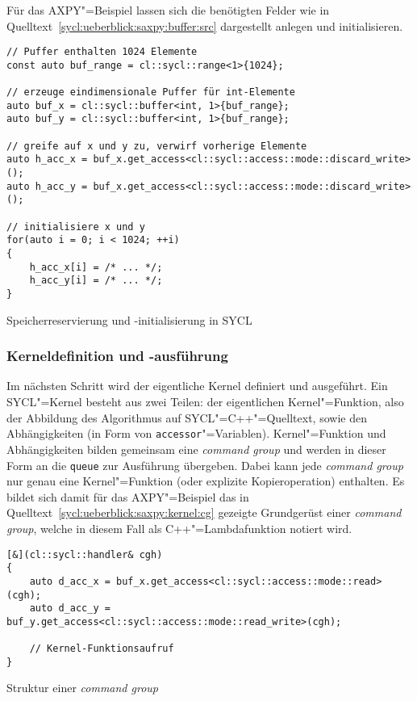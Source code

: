 Für das AXPY"=Beispiel lassen sich die benötigten Felder wie in
Quelltext~\ref{sycl:ueberblick:saxpy:buffer:src} dargestellt anlegen und
initialisieren.
%
\begin{code}
    \begin{verbatim}
// Puffer enthalten 1024 Elemente
const auto buf_range = cl::sycl::range<1>{1024};

// erzeuge eindimensionale Puffer für int-Elemente
auto buf_x = cl::sycl::buffer<int, 1>{buf_range};
auto buf_y = cl::sycl::buffer<int, 1>{buf_range};

// greife auf x und y zu, verwirf vorherige Elemente
auto h_acc_x = buf_x.get_access<cl::sycl::access::mode::discard_write>();
auto h_acc_y = buf_x.get_access<cl::sycl::access::mode::discard_write>();

// initialisiere x und y
for(auto i = 0; i < 1024; ++i)
{
    h_acc_x[i] = /* ... */;
    h_acc_y[i] = /* ... */;
}
    \end{verbatim}
    \caption{Speicherreservierung und -initialisierung in SYCL}
    \label{sycl:ueberblick:saxpy:buffer:src}
\end{code}

\subsubsection{Kerneldefinition und -ausführung}
\label{sycl:ueberblick:saxpy:kernel}

Im nächsten Schritt wird der eigentliche Kernel definiert und ausgeführt. Ein
SYCL"=Kernel besteht aus zwei Teilen: der eigentlichen Kernel"=Funktion, also
der Abbildung des Algorithmus auf SYCL"=C++"=Quelltext, sowie den Abhängigkeiten
(in Form von \texttt{accessor}"=Variablen). Kernel"=Funktion und Abhängigkeiten
bilden gemeinsam eine \textit{command group} und werden in dieser Form an die
\texttt{queue} zur Ausführung übergeben. Dabei kann jede \textit{command group}
nur genau eine Kernel"=Funktion (oder explizite Kopieroperation) enthalten. Es
bildet sich damit für das AXPY"=Beispiel das in
Quelltext~\ref{sycl:ueberblick:saxpy:kernel:cg} gezeigte Grundgerüst einer
\textit{command group}, welche in diesem Fall als C++"=Lambdafunktion notiert
wird.

\begin{code}
    \begin{verbatim}
[&](cl::sycl::handler& cgh)
{
    auto d_acc_x = buf_x.get_access<cl::sycl::access::mode::read>(cgh);
    auto d_acc_y = buf_y.get_access<cl::sycl::access::mode::read_write>(cgh);

    // Kernel-Funktionsaufruf
}
    \end{verbatim}
    \caption{Struktur einer \textit{command group}}
    \label{sycl:ueberblick:saxpy:kernel:cg}
\end{code}

